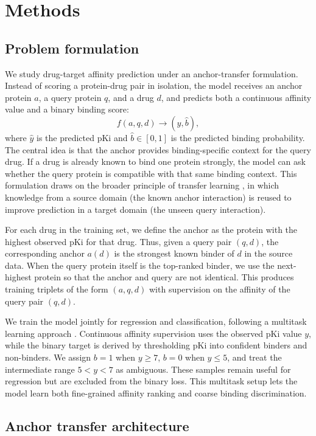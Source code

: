 \section{Methods}

\subsection{Problem formulation}

We study drug-target affinity prediction under an anchor-transfer formulation. Instead of scoring a protein-drug pair in isolation, the model receives an anchor protein $a$, a query protein $q$, and a drug $d$, and predicts both a continuous affinity value and a binary binding score:
\[
f(a,q,d)\rightarrow (\hat{y},\hat{b}),
\]
where $\hat{y}$ is the predicted pKi and $\hat{b}\in[0,1]$ is the predicted binding probability. The central idea is that the anchor provides binding-specific context for the query drug. If a drug is already known to bind one protein strongly, the model can ask whether the query protein is compatible with that same binding context. This formulation draws on the broader principle of transfer learning \cite{pan2010transfer}, in which knowledge from a source domain (the known anchor interaction) is reused to improve prediction in a target domain (the unseen query interaction).

For each drug in the training set, we define the anchor as the protein with the highest observed pKi for that drug. Thus, given a query pair $(q,d)$, the corresponding anchor $a(d)$ is the strongest known binder of $d$ in the source data. When the query protein itself is the top-ranked binder, we use the next-highest protein so that the anchor and query are not identical. This produces training triplets of the form $(a,q,d)$ with supervision on the affinity of the query pair $(q,d)$.

We train the model jointly for regression and classification, following a multitask learning approach \cite{caruana1997multitask}. Continuous affinity supervision uses the observed pKi value $y$, while the binary target is derived by thresholding pKi into confident binders and non-binders. We assign $b=1$ when $y\geq 7$, $b=0$ when $y\leq 5$, and treat the intermediate range $5<y<7$ as ambiguous. These samples remain useful for regression but are excluded from the binary loss. This multitask setup lets the model learn both fine-grained affinity ranking and coarse binding discrimination.

\subsection{Anchor transfer architecture}

